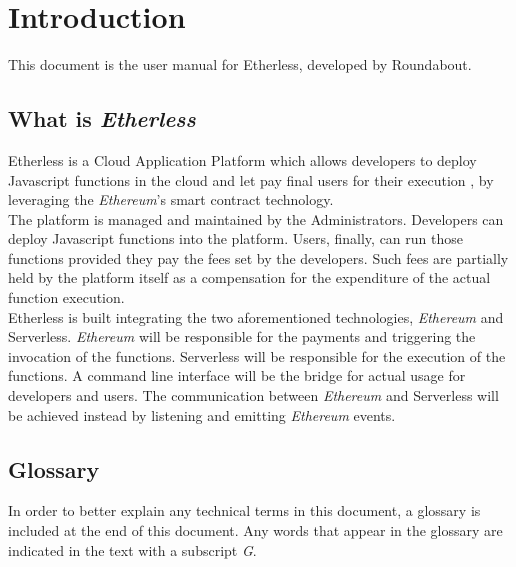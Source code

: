 \section{Introduction}
This document is the user manual for Etherless, developed by Roundabout.
\subsection{What is \textit{Etherless}}
Etherless is a Cloud Application Platform which allows developers to deploy Javascript functions in the cloud and let pay final users for their execution , by leveraging the \textit{Ethereum}'s smart contract technology.\\
The platform is managed and maintained by the Administrators.
Developers can deploy Javascript functions into the platform. Users, finally, can run those functions provided they pay the fees set by the developers. Such fees are partially held by the platform itself as a compensation for the expenditure of the actual function execution.\\
Etherless is built integrating the two aforementioned technologies, \textit{Ethereum} and Serverless. \textit{Ethereum} will be responsible for the payments and triggering the invocation of the functions. Serverless will be responsible for the execution of the functions. A command line interface will be the bridge for actual usage for developers and users. The communication between \textit{Ethereum} and Serverless will be achieved instead by listening and emitting \textit{Ethereum} events.

\subsection{Glossary}
In order to better explain any technical terms in this document, a glossary is included at the end of this document. Any words that appear in the glossary are indicated in the text with a subscript \textit{G}.
